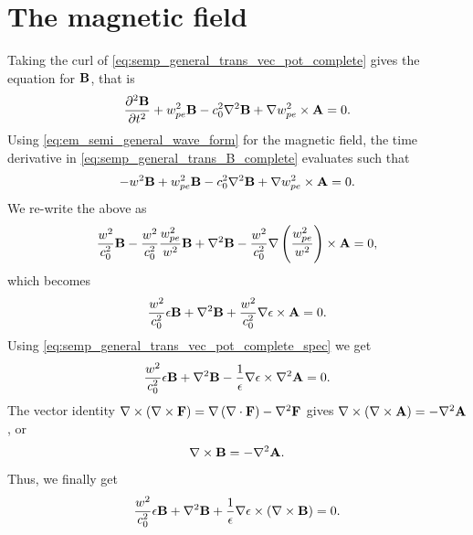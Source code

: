 \documentclass[a4paper,11pt]{report}
\begin{document}
\section{The magnetic field}
Taking the curl of \cref{eq:semp_general_trans_vec_pot_complete} gives the equation for $\mathbf{B}$, that is
\begin{equation}
    \label{eq:semp_general_trans_B_complete}
    \frac{\partial^2 \mathbf{B}}{\partial t^2} + w_{pe}^2 \mathbf{B} - c_0^2 \nabla^2 \mathbf{B} + \nabla w_{pe}^2 \times \mathbf{A} = 0.
\end{equation}
Using \cref{eq:em_semi_general_wave_form} for the magnetic field, the time derivative in \cref{eq:semp_general_trans_B_complete} evaluates such that 
\begin{equation*}
    -w^2 \mathbf{B} + w_{pe}^2 \mathbf{B} - c_0^2 \nabla^2 \mathbf{B} + \nabla w_{pe}^2 \times \mathbf{A} = 0.
\end{equation*}
We re-write the above as
\begin{equation*}
    \frac{w^2}{c_0^2} \mathbf{B} - \frac{w^2}{c_0^2} \frac{w_{pe}^2}{w^2} \mathbf{B} + \nabla^2 \mathbf{B} - \frac{w^2}{c_0^2} \nabla \left ( \frac{w_{pe}^2}{w^2} \right ) \times \mathbf{A} = 0,
\end{equation*}
which becomes
\begin{equation*}
    \frac{w^2}{c_0^2} \epsilon \mathbf{B} + \nabla^2 \mathbf{B} + \frac{w^2}{c_0^2} \nabla \epsilon \times \mathbf{A} = 0.
\end{equation*}
Using \cref{eq:semp_general_trans_vec_pot_complete_spec} we get 
\begin{equation*}
    \frac{w^2}{c_0^2} \epsilon \mathbf{B} + \nabla^2 \mathbf{B} - \frac{1}{\epsilon} \nabla \epsilon \times \nabla^2 \mathbf{A} = 0.
\end{equation*}
The vector identity $\nabla \times \left ( \nabla \times \mathbf{F} \right ) = \nabla \left ( \nabla \cdot \mathbf{F} \right ) - \nabla^2 \mathbf{F}$ gives $\nabla \times \left ( \nabla \times \mathbf{A} \right ) = -\nabla^2 \mathbf{A} $, or
\begin{equation}
    \label{eq:semp_b_to_a_vec_identity}
    \nabla \times \mathbf{B} = -\nabla^2 \mathbf{A}.
\end{equation}
Thus, we finally get
\begin{equation}
    \label{eq:semp_general_trans_B_complete_spec}
    \frac{w^2}{c_0^2} \epsilon \mathbf{B} + \nabla^2 \mathbf{B} + \frac{1}{\epsilon} \nabla \epsilon \times \left ( \nabla \times \mathbf{B} \right ) = 0.
\end{equation}
\end{document}

